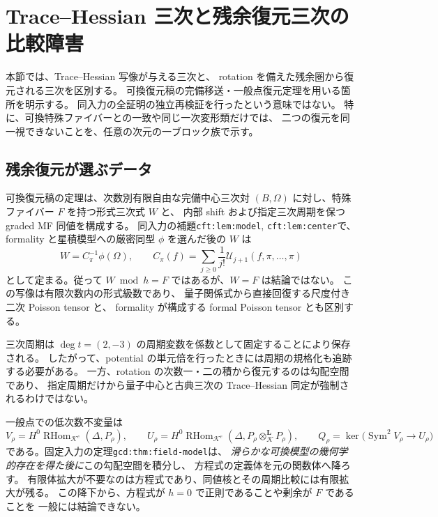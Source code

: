 \section{Trace--Hessian 三次と残余復元三次の比較障害}
\label{sec:nfm-residual-th-obstruction}

本節では、Trace--Hessian 写像が与える三次と、
rotation を備えた残余圏から復元される三次を区別する。
可換復元稿の完備移送・一般点復元定理を用いる箇所を明示する。
同入力の全証明の独立再検証を行ったという意味ではない。
特に、可換特殊ファイバーとの一致や同じ一次変形類だけでは、
二つの復元を同一視できないことを、任意の次元の一ブロック族で示す。

\subsection{残余復元が選ぶデータ}

可換復元稿の定理は、次数別有限自由な完備中心三次対
$(B,\Omega)$ に対し、特殊ファイバー $F$ を持つ形式三次式 $W$ と、
内部 shift および指定三次周期を保つ graded MF 同値を構成する。
同入力の補題\texttt{cft:lem:model}, \texttt{cft:lem:center}で、
formality と星積模型への厳密同型 $\phi$ を選んだ後の $W$ は
\begin{equation}
\label{eq:nfm-formality-central-inverse}
 W=C_\pi^{-1}\phi(\Omega),\qquad
 C_\pi(f)=\sum_{j\ge0}\frac1{j!}
 \mathcal U_{j+1}(f,\pi,\ldots,\pi)
\end{equation}
として定まる。従って $W\bmod h=F$ ではあるが、$W=F$ は結論ではない。
この写像は有限次数内の形式級数であり、
量子関係式から直接回復する尺度付き二次 Poisson tensor と、
formality が構成する formal Poisson tensor とも区別する。

三次周期は $\deg t=(2,-3)$ の周期変数を係数として固定することにより保存される。
したがって、potential の単元倍を行ったときには周期の規格化も追跡する必要がある。
一方、rotation の次数一・二の積から復元するのは勾配空間であり、
指定周期だけから量子中心と古典三次の Trace--Hessian 同定が強制されるわけではない。

一般点での低次数不変量は
\[
 V_\rho=H^0\operatorname{RHom}_{\mathcal K^e}(\Delta,P_\rho),\qquad
 U_\rho=H^0\operatorname{RHom}_{\mathcal K^e}
 (\Delta,P_\rho\otimes_{\mathcal K}^{\mathbf L}P_\rho),
 \qquad
 Q_\rho=\ker\bigl(\operatorname{Sym}^2V_\rho\to U_\rho\bigr)
\]
である。固定入力の定理\texttt{gcd:thm:field-model}は、
\emph{滑らかな可換模型の幾何学的存在を得た後に}この勾配空間を積分し、
方程式の定義体を元の関数体へ降ろす。
有限体拡大が不要なのは方程式であり、同値核とその周期比較には有限拡大が残る。
この降下から、方程式が $h=0$ で正則であることや剰余が $F$ であることを
一般には結論できない。

